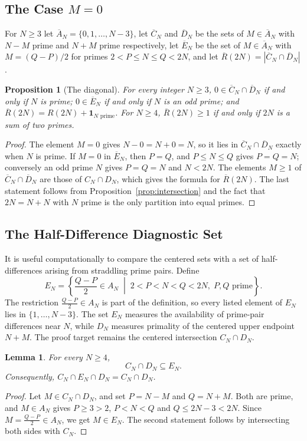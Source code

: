 \documentclass[11pt]{amsart}
\newtheorem{Proposition}[Theorem]{Proposition}
\newtheorem{Lemma}[Theorem]{Lemma}
\theoremstyle{definition}
\theoremstyle{remark}
\begin{document}
\subsection{The Case $M=0$}\label{subsec:M-zero}
For $N\geq 3$ let $\overline{A}_N=\{0,1,\ldots,N-3\}$, let $\overline{C}_N$ and $\overline{D}_N$ be the sets of $M\in\overline{A}_N$ with $N-M$ prime and $N+M$ prime respectively, let $\overline{E}_N$ be the set of $M\in\overline{A}_N$ with $M=(Q-P)/2$ for primes $2<P\leq N\leq Q<2N$, and let $\overline{R}(2N)=|\overline{C}_N\cap\overline{D}_N|$.
\begin{Proposition}[The diagonal]\label{prop:M-zero}
For every integer $N\geq 3$, $0\in\overline{C}_N\cap\overline{D}_N$ if and only if $N$ is prime; $0\in\overline{E}_N$ if and only if $N$ is an odd prime; and $\overline{R}(2N)=R(2N)+\mathbf 1_{N\text{ prime}}$. For $N\geq 4$, $\overline{R}(2N)\geq 1$ if and only if $2N$ is a sum of two primes.
\end{Proposition}
\begin{proof}
The element $M=0$ gives $N-0=N+0=N$, so it lies in $\overline{C}_N\cap\overline{D}_N$ exactly when $N$ is prime. If $M=0$ in $\overline{E}_N$, then $P=Q$, and $P\leq N\leq Q$ gives $P=Q=N$; conversely an odd prime $N$ gives $P=Q=N$ and $N<2N$. The elements $M\geq 1$ of $\overline{C}_N\cap\overline{D}_N$ are those of $C_N\cap D_N$, which gives the formula for $\overline{R}(2N)$. The last statement follows from Proposition~\ref{prop:intersection} and the fact that $2N=N+N$ with $N$ prime is the only partition into equal primes.
\end{proof}

\subsection{The Half-Difference Diagnostic Set}\label{subsec:diagnostic}
It is useful computationally to compare the centered sets with a set of half-differences arising from straddling prime pairs. Define
\[
E_N =
\left\{
\frac{Q-P}{2}\in A_N \;\middle|\; 2<P<N<Q<2N,\; P,Q \text{ prime}
\right\}.
\]
The restriction $\frac{Q-P}{2}\in A_N$ is part of the definition, so every listed element of $E_N$ lies in $\{1,\ldots,N-3\}$. The set $E_N$ measures the availability of prime-pair differences near $N$, while $D_N$ measures primality of the centered upper endpoint $N+M$. The proof target remains the centered intersection $C_N\cap D_N$.

\begin{Lemma}\label{lem:CD-in-E}
For every $N\geq 4$,
\[
C_N\cap D_N\subseteq E_N.
\]
Consequently, $C_N\cap E_N\cap D_N=C_N\cap D_N$.
\end{Lemma}
\begin{proof}
Let $M\in C_N\cap D_N$, and set $P=N-M$ and $Q=N+M$. Both are prime, and $M\in A_N$ gives $P\geq 3>2$, $P<N<Q$ and $Q\leq 2N-3<2N$. Since $M=\frac{Q-P}{2}\in A_N$, we get $M\in E_N$. The second statement follows by intersecting both sides with $C_N$.
\end{proof}
\end{document}
